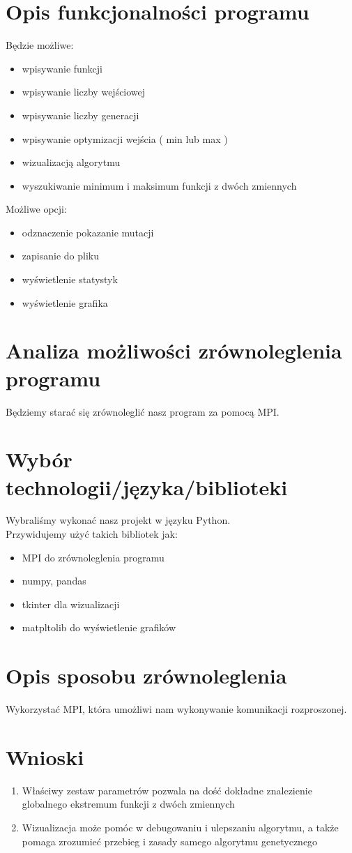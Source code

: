 \documentclass[a4paper, 12pt]{article}
\begin{document}
\section{Opis funkcjonalności programu}
Będzie możliwe:
\begin{itemize}
    \item wpisywanie funkcji
    \item wpisywanie liczby wejściowej 
    \item wpisywanie liczby generacji
    \item wpisywanie optymizacji wejścia ( min lub max )
    \item wizualizacją algorytmu
    \item wyszukiwanie minimum i maksimum funkcji z dwóch zmiennych
\end{itemize}
Możliwe opcji:
\begin{itemize}
    \item odznaczenie pokazanie mutacji
    \item zapisanie do pliku
    \item wyświetlenie  statystyk
    \item wyświetlenie  grafika
\end{itemize}
\section{Analiza możliwości zrównoleglenia programu}
\hspace*{1cm} Będziemy starać się zrównoleglić nasz program za pomocą MPI.
\section{Wybór technologii/języka/biblioteki}
\hspace*{1cm} Wybraliśmy wykonać nasz projekt w języku Python.\\ 
Przywidujemy użyć takich bibliotek jak:
\begin{itemize}
    \item MPI do zrównoleglenia programu
    \item numpy, pandas
    \item tkinter dla wizualizacji
    \item matpltolib do wyświetlenie grafików
\end{itemize}
\section{Opis sposobu zrównoleglenia}
Wykorzystać MPI, która umożliwi nam wykonywanie komunikacji rozproszonej.
\section{Wnioski} 
\begin{enumerate}
    \item Właściwy zestaw parametrów pozwala na dość dokładne znalezienie globalnego ekstremum funkcji z dwóch zmiennych
    \item Wizualizacja może pomóc w debugowaniu i ulepszaniu algorytmu, a także pomaga zrozumieć przebieg i zasady samego algorytmu genetycznego
\end{enumerate}

\label{LastPage}~
\label{LastPageOfBackMatter}~		
\end{document}
